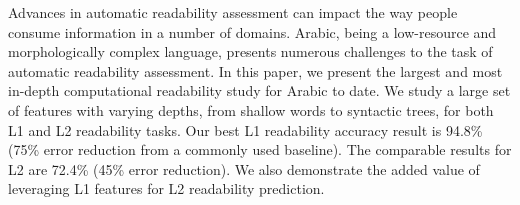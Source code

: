 Advances in automatic readability assessment can impact the way people consume information in a number of domains. Arabic, being a low-resource and morphologically complex language, presents numerous challenges to the task of automatic readability assessment. In this paper, we present the largest and most in-depth  computational readability study for Arabic to date.  We study a large set of features with varying depths, from shallow words to syntactic trees, for both L1 and L2 readability tasks. Our best L1 readability accuracy result is 94.8\% (75\% error reduction from a commonly used baseline). The comparable results for L2 are 72.4\% (45\% error reduction). We also demonstrate the added value of leveraging L1 features for L2 readability prediction.
